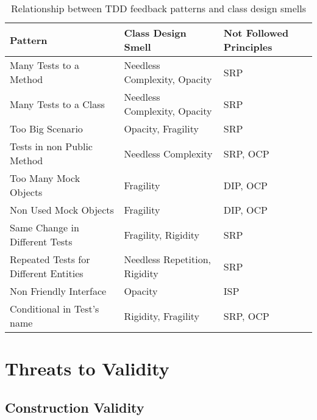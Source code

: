 \documentclass[times]{elsarticle}
\begin{document}
\begin{table}[h!]
	\centering
	\begin{tabular}{| p{4.5cm} | p{4.5cm} | p{3cm} | }
		\hline

		\textbf{Pattern} & \textbf{Class Design Smell} & \textbf{Not Followed Principles}\\
		
		\hline

		Many Tests to a Method                   & Needless Complexity, Opacity   & SRP \\ \hline
		Many Tests to a Class                  & Needless Complexity, Opacity   & SRP \\ \hline
		Too Big Scenario                           & Opacity, Fragility                  & SRP \\ \hline
		Tests in non Public Method             & Needless Complexity              & SRP, OCP \\ \hline
		Too Many Mock Objects                       & Fragility                             & DIP, OCP \\ \hline
		Non Used Mock Objects                  & Fragility                             & DIP, OCP \\ \hline
		Same Change in Different Tests           & Fragility, Rigidity                    & SRP \\ \hline
		Repeated Tests for Different Entities     & Needless Repetition, Rigidity        & SRP  \\ \hline
		Non Friendly Interface                         & Opacity                               & ISP \\ \hline
		Conditional in Test's name                   & Rigidity, Fragility                    & SRP, OCP \\

		\hline
		
	\end{tabular}
	\caption{Relationship between TDD feedback patterns and class design smells}
	\label{tab:relacao-padroes}
\end{table}

\section{Threats to Validity}
\label{cap:ameacas}

\subsection{Construction Validity}
\end{document}
